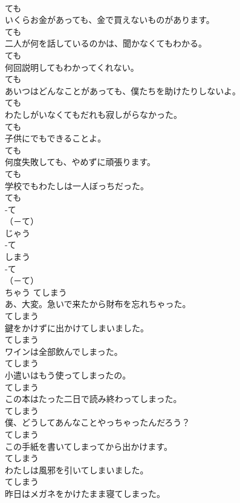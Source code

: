 \documentclass[8pt]{extreport}
\begin{document}
\begin{CJK}{UTF8}{min}
\\	ても
\\	いくらお金があっても、金で買えないものがあります。	
\\	ても
\\	二人が何を話しているのかは、聞かなくてもわかる。	
\\	ても
\\	何回説明してもわかってくれない。	
\\	ても
\\	あいつはどんなことがあっても、僕たちを助けたりしないよ。	
\\	ても
\\	わたしがいなくてもだれも寂しがらなかった。	
\\	ても
\\	子供にでもできることよ。	
\\	ても
\\	何度失敗しても、やめずに頑張ります。	
\\	ても
\\	学校でもわたしは一人ぼっちだった。	
\\	ても
\\	-て
\\	（－て） 
\\	じゃう	
\\	-て
\\	しまう	
\\	-て
\\	（－て） 
\\	ちゃう	てしまう
\\	あ、大変。急いで来たから財布を忘れちゃった。	
\\	てしまう
\\	鍵をかけずに出かけてしまいました。	
\\	てしまう
\\	ワインは全部飲んでしまった。	
\\	てしまう
\\	小遣いはもう使ってしまったの。	
\\	てしまう
\\	この本はたった二日で読み終わってしまった。	
\\	てしまう
\\	僕、どうしてあんなことやっちゃったんだろう？	
\\	てしまう
\\	この手紙を書いてしまってから出かけます。	
\\	てしまう
\\	わたしは風邪を引いてしまいました。	
\\	てしまう
\\	昨日はメガネをかけたまま寝てしまった。	

\end{CJK}
\end{document}
